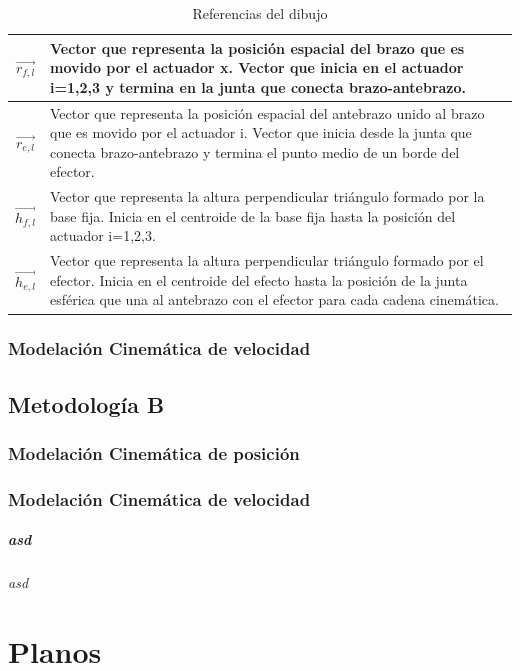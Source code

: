\begin{table}[H]
\begin{tabular}{|c|m{12cm}|}
                   $\overrightarrow{r_{f,l}}$  & Vector que representa la posición espacial del brazo que es movido por el actuador x. Vector que inicia en el actuador i=1,2,3 y termina en la junta que conecta brazo-antebrazo.     \\\hline
                  $\overrightarrow{r_{e,l}}$  & Vector que representa la posición espacial del antebrazo unido al brazo que es movido por el actuador i. Vector que inicia desde la junta que conecta brazo-antebrazo y termina el punto medio de un borde del efector.    \\\hline
                  $\overrightarrow{h_{f,l}}$  & Vector que representa la altura perpendicular triángulo formado por la base fija. Inicia en el centroide de la base fija hasta la posición del actuador i=1,2,3.    \\\hline
                  $\overrightarrow{h_{e,l}}$  & Vector que representa la altura perpendicular triángulo formado por el efector. Inicia en el centroide del efecto hasta la posición de la junta esférica que una al antebrazo con el efector para cada cadena cinemática.    \\\hline
                \end{tabular}
                \caption{Referencias del dibujo}
                \label{tab:Anexo_B_my_label2}
            \end{table}
        \endgroup
        
        \subsection{Modelación Cinemática de velocidad}
        
        
    \section{Metodología B}
        \subsection{Modelación Cinemática de posición}
        \subsection{Modelación Cinemática de velocidad}
        
        

            \paragraph{asd} 
                \subparagraph{asd}

        
\chapter{Planos}\label{anexoC}
\thispagestyle{fancy}
    \section{}
        \subsection{}